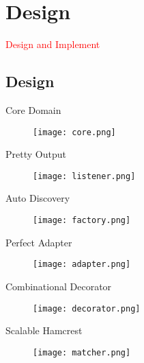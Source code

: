 \section{Design}
\label{sec:design}

\begin{frame}
  \begin{center}
    \Huge{\textcolor{red}{Design and Implement}}
  \end{center}
\end{frame}

\subsection{Design}

\begin{frame}{Core Domain}
    \centering
    \begin{figure}
      \centering
      \texttt{[image: core.png]}
    \end{figure}
\end{frame}

\begin{frame}{Pretty Output}
    \centering
    \begin{figure}
      \centering
      \texttt{[image: listener.png]}
    \end{figure}
\end{frame}

\begin{frame}{Auto Discovery}
    \centering
    \begin{figure}
      \centering
      \texttt{[image: factory.png]}
    \end{figure}
\end{frame}

\begin{frame}{Perfect Adapter}
    \centering
    \begin{figure}
      \centering
      \texttt{[image: adapter.png]}
    \end{figure}
\end{frame}

\begin{frame}{Combinational Decorator}
    \centering
    \begin{figure}
      \centering
      \texttt{[image: decorator.png]}
    \end{figure}
\end{frame}

\begin{frame}{Scalable Hamcrest}
    \centering
    \begin{figure}
      \centering
      \texttt{[image: matcher.png]}
    \end{figure}
\end{frame}
